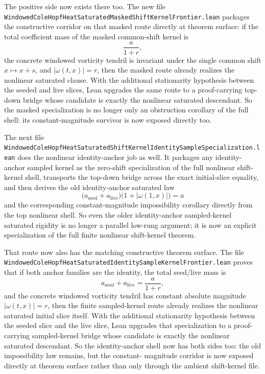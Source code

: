 \documentclass[11pt]{article}
\begin{document}
The positive side now exists there too.  The new file
\texttt{WindowedColeHopfHeatSaturatedMaskedShiftKernelFrontier.lean}
packages the constructive corridor on that masked route directly at theorem
surface: if the total coefficient mass of the masked common-shift kernel is
\[
  \frac{a}{1+r},
\]
the concrete windowed vorticity tendril is invariant under the single common
shift \(x \mapsto x + s\), and \(|\omega(t,x)| = r\), then the masked route
already realizes the nonlinear saturated clause.  With the additional
stationarity hypothesis between the seeded and live slices, Lean upgrades the
same route to a proof-carrying top-down bridge whose candidate is exactly the
nonlinear saturated descendant.  So the masked specialization is no longer only
an obstruction corollary of the full shell: its constant-magnitude survivor is
now exposed directly too.

The next file
\texttt{WindowedColeHopfHeatSaturatedShiftKernelIdentitySampleSpecialization.lean}
does the nonlinear identity-anchor job as well.  It packages any identity-anchor
sampled kernel as the zero-shift specialization of the full nonlinear
shift-kernel shell, transports the top-down bridge across the exact initial-slice
equality, and then derives the old identity-anchor saturated law
\[
  \bigl(a_{\mathrm{seed}} + a_{\mathrm{live}}\bigr)
  \bigl(1 + |\omega(1,x)|\bigr) = a
\]
and the corresponding constant-magnitude impossibility corollary directly from
the top nonlinear shell.  So even the older identity-anchor sampled-kernel
saturated rigidity is no longer a parallel low-rung argument; it is now an
explicit specialization of the full finite nonlinear shift-kernel theorem.

That route now also has the matching constructive theorem surface.  The file
\texttt{WindowedColeHopfHeatSaturatedIdentitySampleKernelFrontier.lean}
proves that if both anchor families are the identity, the total seed/live mass
is
\[
  a_{\mathrm{seed}} + a_{\mathrm{live}} = \frac{a}{1+r},
\]
and the concrete windowed vorticity tendril has constant absolute magnitude
\(|\omega(t,x)| = r\), then the finite sampled-kernel route already realizes
the nonlinear saturated initial slice itself.  With the additional stationarity
hypothesis between the seeded slice and the live slice, Lean upgrades that
specialization to a proof-carrying sampled-kernel bridge whose candidate is
exactly the nonlinear saturated descendant.  So the identity-anchor shell now
has both sides too: the old impossibility law remains, but the constant-
magnitude corridor is now exposed directly at theorem surface rather than only
through the ambient shift-kernel file.
\end{document}
